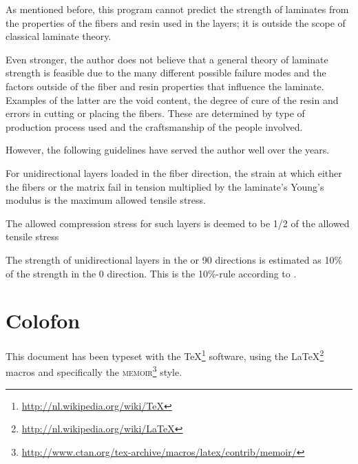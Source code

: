 \documentclass[a4paper,landscape,oneside,11pt,twocolumn]{memoir}
\begin{document}
As mentioned before, this program cannot predict the strength of laminates
from the properties of the fibers and resin used in the layers; it is outside
the scope of classical laminate theory.

Even stronger, the author does not believe that a general theory of laminate
strength is feasible due to the many different possible failure modes and
the factors outside of the fiber and resin properties that influence the
laminate.  Examples of the latter are the void content, the degree of cure of
the resin and errors in cutting or placing the fibers. These are determined by
type of production process used and the craftsmanship of the people involved.

However, the following guidelines have served the author well over the years.

For unidirectional layers loaded in the fiber direction, the strain at which
either the fibers or the matrix fail in tension multiplied by the laminate's
Young's modulus is the maximum allowed tensile stress.

The allowed compression stress for such layers is deemed to be 1/2 of the
allowed tensile stress

The strength of unidirectional layers in the \textdegree{} or
90\textdegree{} directions is estimated as 10\% of the strength in the
0\textdegree{} direction. This is the 10\%-rule according to
\citet{1992WeiEn..52...29H}.

%

\chapter{Colofon}

This document has been typeset with the
\TeX\footnote{\url{http://nl.wikipedia.org/wiki/TeX}}
software, using the \LaTeX\footnote{\url{http://nl.wikipedia.org/wiki/LaTeX}}
macros and specifically the
\textsc{memoir}\footnote{%
    \url{http://www.ctan.org/tex-archive/macros/latex/contrib/memoir/}} style.
\end{document}

